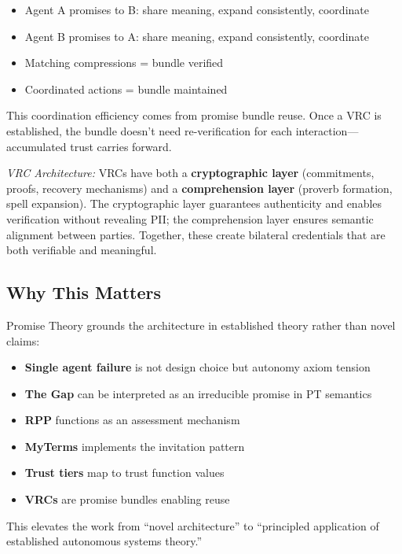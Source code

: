 \documentclass[
]{article}
\providecommand{\tightlist}{%
  \setlength{\itemsep}{0pt}\setlength{\parskip}{0pt}}
\begin{document}
\begin{itemize}
\tightlist
\item
  Agent A promises to B: share meaning, expand consistently, coordinate
\item
  Agent B promises to A: share meaning, expand consistently, coordinate
\item
  Matching compressions = bundle verified
\item
  Coordinated actions = bundle maintained
\end{itemize}

This coordination efficiency comes from promise bundle reuse. Once a VRC
is established, the bundle doesn't need re-verification for each
interaction---accumulated trust carries forward.

\emph{VRC Architecture:} VRCs have both a \textbf{cryptographic layer}
(commitments, proofs, recovery mechanisms) and a \textbf{comprehension
layer} (proverb formation, spell expansion). The cryptographic layer
guarantees authenticity and enables verification without revealing PII;
the comprehension layer ensures semantic alignment between parties.
Together, these create bilateral credentials that are both verifiable
and meaningful.

\subsection{Why This Matters}\label{why-this-matters}

Promise Theory grounds the architecture in established theory rather
than novel claims:

\begin{itemize}
\tightlist
\item
  \textbf{Single agent failure} is not design choice but autonomy axiom
  tension
\item
  \textbf{The Gap} can be interpreted as an irreducible promise in PT
  semantics
\item
  \textbf{RPP} functions as an assessment mechanism
\item
  \textbf{MyTerms} implements the invitation pattern
\item
  \textbf{Trust tiers} map to trust function values
\item
  \textbf{VRCs} are promise bundles enabling reuse
\end{itemize}

This elevates the work from ``novel architecture'' to ``principled
application of established autonomous systems theory.''
\end{document}
